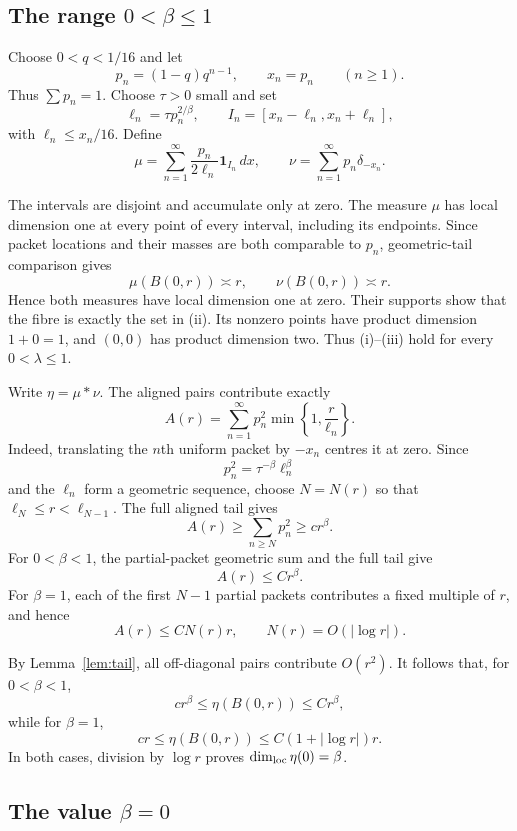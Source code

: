 \documentclass[11pt]{article}
\begin{document}
\subsection{The range \texorpdfstring{$0<\beta\leq1$}{0 < beta <= 1}}

Choose $0<q<1/16$ and let
\[
 p_n=(1-q)q^{n-1},\qquad x_n=p_n \qquad(n\geq1).
\]
Thus $\sum p_n=1$.  Choose $\tau>0$ small and set
\[
 \ell_n=\tau p_n^{2/\beta},\qquad
 I_n=[x_n-\ell_n,x_n+\ell_n],
\]
with $\ell_n\leq x_n/16$.  Define
\begin{equation}\label{eq:symmetric}
 \mu=\sum_{n=1}^\infty
 \frac{p_n}{2\ell_n}\mathbf1_{I_n}\,dx,
 \qquad
 \nu=\sum_{n=1}^\infty p_n\delta_{-x_n}.
\end{equation}

The intervals are disjoint and accumulate only at zero.  The measure $\mu$
has local dimension one at every point of every interval, including its
endpoints.  Since packet locations and their masses are both comparable to
$p_n$, geometric-tail comparison gives
\[
 \mu(B(0,r))\asymp r,
 \qquad
 \nu(B(0,r))\asymp r.
\]
Hence both measures have local dimension one at zero.  Their supports show
that the fibre is exactly the set in (ii).  Its nonzero points have product
dimension $1+0=1$, and $(0,0)$ has product dimension two.  Thus (i)--(iii)
hold for every $0<\lambda\leq1$.

Write $\eta=\mu*\nu$.  The aligned pairs contribute exactly
\begin{equation}\label{eq:aligned}
 A(r)=\sum_{n=1}^\infty p_n^2
 \min\left\{1,\frac r{\ell_n}\right\}.
\end{equation}
Indeed, translating the $n$th uniform packet by $-x_n$ centres it at zero.
Since
\[
 p_n^2=\tau^{-\beta}\ell_n^\beta
\]
and the $\ell_n$ form a geometric sequence, choose $N=N(r)$ so that
$\ell_N\leq r<\ell_{N-1}$.  The full aligned tail gives
\[
 A(r)\geq\sum_{n\geq N}p_n^2\geq c r^\beta.
\]
For $0<\beta<1$, the partial-packet geometric sum and the full tail give
\[
 A(r)\leq C r^\beta.
\]
For $\beta=1$, each of the first $N-1$ partial packets contributes a fixed
multiple of $r$, and hence
\[
 A(r)\leq C N(r)r,
 \qquad N(r)=O(|\log r|).
\]

By Lemma~\ref{lem:tail}, all off-diagonal pairs contribute $O(r^2)$.  It
follows that, for $0<\beta<1$,
\[
 c r^\beta\leq\eta(B(0,r))\leq C r^\beta,
\]
while for $\beta=1$,
\[
 c r\leq\eta(B(0,r))\leq C(1+|\log r|)r.
\]
In both cases, division by $\log r$ proves
$\dim_{\rm loc}\eta(0)=\beta$.

\subsection{The value \texorpdfstring{$\beta=0$}{beta = 0}}
\end{document}
